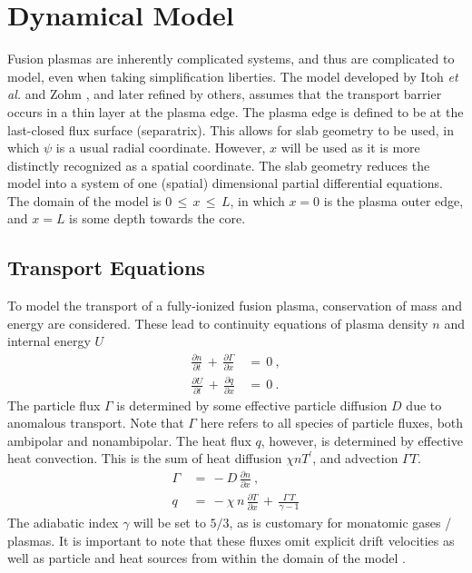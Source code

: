 \chapter{Dynamical Model}\label{chapter:dynamical_model}
Fusion plasmas are inherently complicated systems, and thus are complicated to model, even when taking simplification liberties.
The model developed by Itoh \emph{et al.} \cite{itoh_edge_1991} and Zohm \cite{zohm_dynamic_1994}, and later refined by others, assumes that the transport barrier occurs in a thin layer at the plasma edge.
The plasma edge is defined to be at the last-closed flux surface (separatrix).
This allows for slab geometry to be used, in which $\psi$ is a usual radial coordinate.
However, $x$ will be used as it is more distinctly recognized as a spatial coordinate.
The slab geometry reduces the model into a system of one (spatial) dimensional partial differential equations.
The domain of the model is $0 \,\leq\, x \,\leq\, L$, in which $x = 0$ is the plasma outer edge, and $x = L$ is some depth towards the core.

\section{Transport Equations}\label{sec:transport_eqs}
To model the transport of a fully-ionized fusion plasma, conservation of mass and energy are considered.
These lead to continuity equations of plasma density $n$ and internal energy $U$
\begin{align} %
	\frac{\partial n}{\partial t} \,+\, \frac{\partial \Gamma}{\partial x} \,&=\, 0~,\label{eq:n_continuity} \\
	\frac{\partial U}{\partial t} \,+\, \frac{\partial q}{\partial x} \,&=\, 0\label{eq:U_continuity}~.
\end{align}
The particle flux $\Gamma$ is determined by some effective particle diffusion $D$ due to anomalous transport.
Note that $\Gamma$ here refers to all species of particle fluxes, both ambipolar and nonambipolar.
The heat flux $q$, however, is determined by effective heat convection.
This is the sum of heat diffusion $\chi n T^\prime$, and advection $\Gamma T$.
\begin{align} %
	\Gamma \,&=\, -D \, \frac{\partial n}{\partial x}~,
		\label{eq:particle_flux} \\
	q \,&=\, -\chi \, n \, \frac{\partial T}{\partial x} \,+\,
		\frac{\Gamma \, T}{\gamma - 1} \label{eq:heat_flux}
\end{align}
The adiabatic index $\gamma$ will be set to $5/3$, as is customary for monatomic gases / plasmas.
It is important to note that these fluxes omit explicit drift velocities as well as particle and heat sources from within the domain of the model \cite{zohm_dynamic_1994}.


